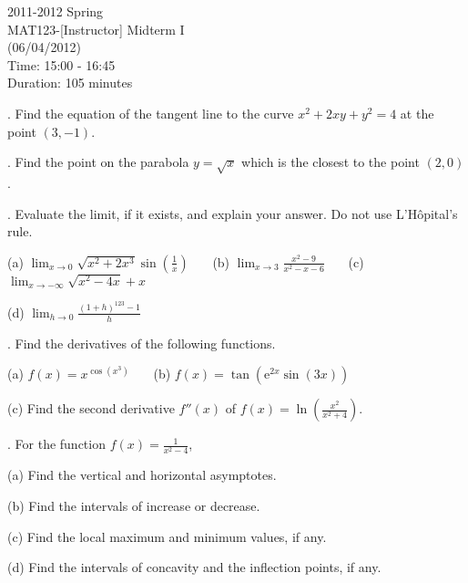 \documentclass{article}
\begin{document}
\pagestyle{empty}
\large

\begin{center}
2011-2012 Spring \\MAT123-[Instructor] Midterm I\\(06/04/2012)\\Time: 15:00 - 16:45\\Duration: 105 minutes
\end{center}

. Find the equation of the tangent line to the curve $x^2+2xy+y^2=4$ at the point $(3,-1)$.

\hfill

. Find the point on the parabola $y=\sqrt x$ which is the closest to the point $(2,0)$.

\hfill

. Evaluate the limit, if it exists, and explain your answer. Do not use L'Hôpital's rule.

\hfill

(a) $\displaystyle\lim_{x\to0}\sqrt{x^2+2x^3} \sin\left(\frac1x\right)$ \ \ \ (b) $\displaystyle \lim_{x\to3}\frac{x^2-9}{x^2-x-6}$ \ \ \ (c) $\displaystyle \lim_{x\to-\infty}\sqrt{x^2-4x}+x$

\hfill

(d) $\displaystyle\lim_{h\to0}\frac{(1+h)^{123}-1}{h}$

\hfill

. Find the derivatives of the following functions.

\hfill

(a) $f(x)=x^{\cos\left(x^3\right)}$ \ \ \ (b) $f(x) = \tan\left(\mathrm{e}^{2x}\sin(3x)\right)$

\hfill

(c) Find the second derivative $f''(x)$ of $\displaystyle f(x) =\ln\left(\frac{x^2}{x^2+4}\right)$.

\hfill

. For the function $\displaystyle f(x)=\frac{1}{x^2-4}$,

\hfill

(a) Find the vertical and horizontal asymptotes.

\hfill

(b) Find the intervals of increase or decrease.

\hfill

(c) Find the local maximum and minimum values, if any.

\hfill

(d) Find the intervals of concavity and the inflection points, if any.
\end{document}
